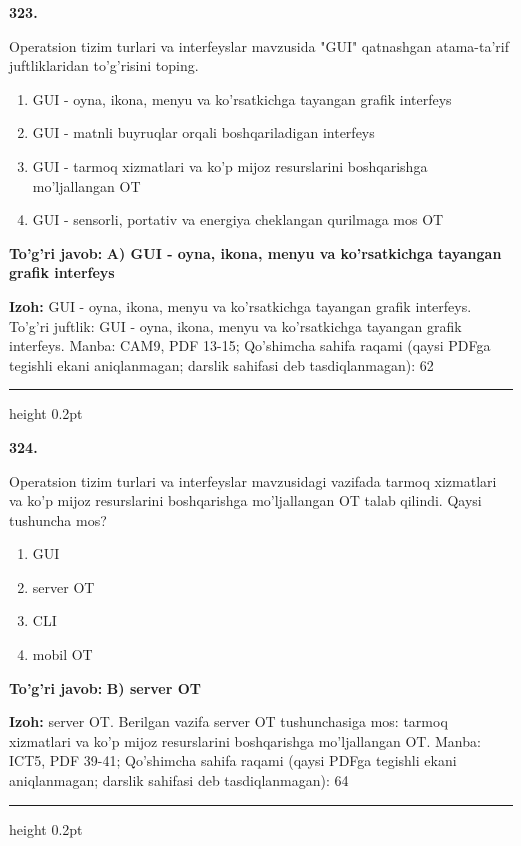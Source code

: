 \documentclass[10pt,a4paper]{article}
\begin{document}
{\bfseries\sffamily\color{ink} 323.}
\par
Operatsion tizim turlari va interfeyslar mavzusida "GUI" qatnashgan atama-ta'rif juftliklaridan to'g'risini toping.
\begin{enumerate}[label=\Alph*),leftmargin=9mm]
\item GUI - oyna, ikona, menyu va ko'rsatkichga tayangan grafik interfeys
\item GUI - matnli buyruqlar orqali boshqariladigan interfeys
\item GUI - tarmoq xizmatlari va ko'p mijoz resurslarini boshqarishga mo'ljallangan OT
\item GUI - sensorli, portativ va energiya cheklangan qurilmaga mos OT
\end{enumerate}
\begin{tcolorbox}[enhanced,breakable,colback=teal!4,colframe=teal!60!black,boxrule=0.45pt,arc=1.2mm,left=2.7mm,right=2.7mm,top=1.8mm,bottom=1.8mm,before skip=2mm,after skip=2mm]
{\bfseries\sffamily\color{teal}To'g'ri javob:} \textbf{A) GUI - oyna, ikona, menyu va ko'rsatkichga tayangan grafik interfeys}
\par\smallskip
{\bfseries Izoh:} GUI - oyna, ikona, menyu va ko'rsatkichga tayangan grafik interfeys. To'g'ri juftlik: GUI - oyna, ikona, menyu va ko'rsatkichga tayangan grafik interfeys. Manba: CAM9, PDF 13-15; Qo'shimcha sahifa raqami (qaysi PDFga tegishli ekani aniqlanmagan; darslik sahifasi deb tasdiqlanmagan): 62
\end{tcolorbox}
\vspace{2mm}\hrule height 0.2pt\vspace{3mm}

{\bfseries\sffamily\color{ink} 324.}
\par
Operatsion tizim turlari va interfeyslar mavzusidagi vazifada tarmoq xizmatlari va ko'p mijoz resurslarini boshqarishga mo'ljallangan OT talab qilindi. Qaysi tushuncha mos?
\begin{enumerate}[label=\Alph*),leftmargin=9mm]
\item GUI
\item server OT
\item CLI
\item mobil OT
\end{enumerate}
\begin{tcolorbox}[enhanced,breakable,colback=teal!4,colframe=teal!60!black,boxrule=0.45pt,arc=1.2mm,left=2.7mm,right=2.7mm,top=1.8mm,bottom=1.8mm,before skip=2mm,after skip=2mm]
{\bfseries\sffamily\color{teal}To'g'ri javob:} \textbf{B) server OT}
\par\smallskip
{\bfseries Izoh:} server OT. Berilgan vazifa server OT tushunchasiga mos: tarmoq xizmatlari va ko'p mijoz resurslarini boshqarishga mo'ljallangan OT. Manba: ICT5, PDF 39-41; Qo'shimcha sahifa raqami (qaysi PDFga tegishli ekani aniqlanmagan; darslik sahifasi deb tasdiqlanmagan): 64
\end{tcolorbox}
\vspace{2mm}\hrule height 0.2pt\vspace{3mm}
\end{document}
